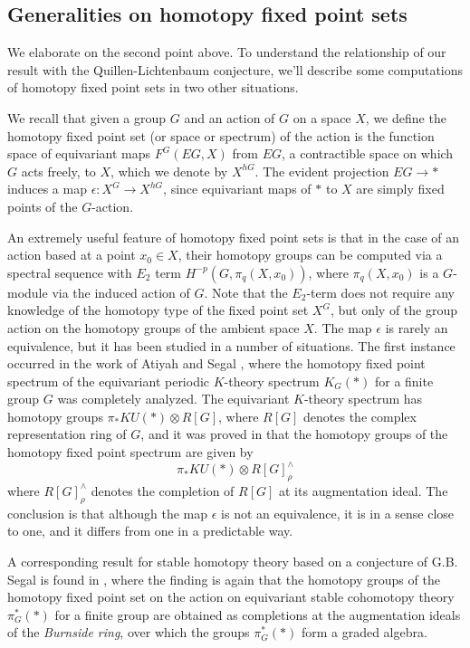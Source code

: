 \documentclass[11pt]{article}
\begin{document}
\subsection{Generalities on homotopy fixed point sets}
We elaborate on the  second point above.
To understand the relationship of our result with the Quillen-Lichtenbaum conjecture, we'll describe some computations of homotopy fixed point sets in two other situations.  

We recall that given a group $G$ and an action of $G$ on a space $X$, we define the homotopy fixed point set  (or space or spectrum)  of the action is the function space of equivariant maps $F^G(EG, X)$ from $EG$, a contractible space on which $G$ acts freely, to $X$, which we denote by $X^{hG}$.  The evident projection $EG \rightarrow *$ induces a map $ \epsilon: X^G \rightarrow X^{hG}$, since  equivariant maps of $*$ to $X$ are simply fixed points of the $G$-action. 

An extremely useful feature of homotopy fixed point sets is that in the case of an action  based at a point $x_0 \in X$,  their homotopy groups can be computed via a spectral sequence with $E_2$ term $H^{-p}(G,\pi _q (X,x_0))$, where $\pi _q(X,x_0)$ is a $G$-module via the induced action of $G$.  Note that the $E_2$-term does not require any knowledge of the homotopy type of the fixed point set $X^G$, but only of the group action on the homotopy groups of the ambient space $X$.  The map $\epsilon$ is rarely an equivalence, but it has been studied in a number of situations.  The first instance occurred in the work of Atiyah and Segal \cite{atiyahsegal}, where the homotopy fixed point spectrum of the equivariant periodic $K$-theory  spectrum $K_G(*)$ for a finite group $G$ was completely analyzed. The equivariant $K$-theory spectrum has homotopy groups $\pi _*KU(*) \otimes R[G]$, where $R[G]$ denotes the complex representation ring of $G$, and it was proved in \cite{atiyahsegal} that the homotopy groups of the homotopy fixed point spectrum are given by $$\pi _* KU(*) \otimes R[G]^{\wedge}_{\rho}$$
where $R[G]^{\wedge}_{\rho} $ denotes the completion of $R[G]$ at its augmentation ideal.  
  The conclusion is that although the map $\epsilon$ is not an equivalence, it is in a sense close to one, and it differs from one in a  predictable way.  

A corresponding result for stable homotopy theory  based on a conjecture of G.B. Segal is found in \cite{segalconjecture}, where the finding is again that the homotopy groups of the homotopy fixed point set on the action on equivariant stable cohomotopy theory $\pi _G^*(*)$ for a finite group are obtained as completions at the augmentation ideals of the {\em Burnside ring}, over which the groups $\pi_G^*(*) $ form a graded algebra. 
\end{document}
